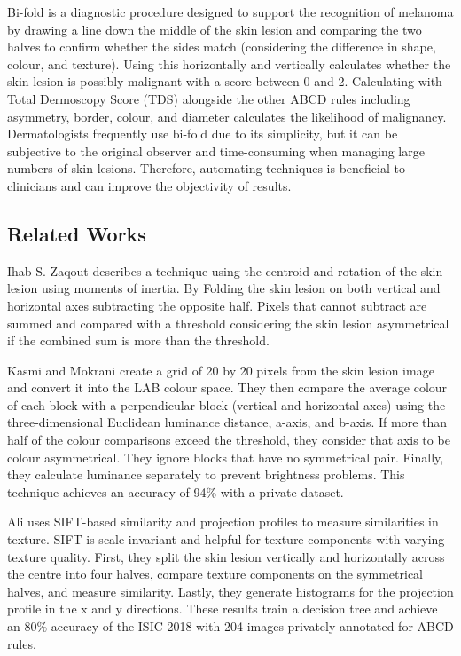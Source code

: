 Bi-fold is a diagnostic procedure designed to support the recognition of melanoma by drawing a line down the middle of the skin lesion and comparing the two halves to confirm whether the sides match (considering the difference in shape, colour, and texture). Using this horizontally and vertically calculates whether the skin lesion is possibly malignant with a score between 0 and 2. Calculating with Total Dermoscopy Score (TDS) alongside the other ABCD rules including asymmetry, border, colour, and diameter calculates the likelihood of malignancy. Dermatologists frequently use bi-fold due to its simplicity, but it can be subjective to the original observer and time-consuming when managing large numbers of skin lesions. Therefore, automating techniques is beneficial to clinicians and can improve the objectivity of results.

\subsection{Related Works}
Ihab S. Zaqout\cite{Zaqout2016} describes a technique using the centroid and rotation of the skin lesion using moments of inertia. By Folding the skin lesion on both vertical and horizontal axes subtracting the opposite half. Pixels that cannot subtract are summed and compared with a threshold considering the skin lesion asymmetrical if the combined sum is more than the threshold.

Kasmi and Mokrani\cite{Kasmi2016} create a grid of 20 by 20 pixels from the skin lesion image and convert it into the LAB colour space. They then compare the average colour of each block with a perpendicular block (vertical and horizontal axes) using the three-dimensional Euclidean luminance distance, a-axis, and b-axis. If more than half of the colour comparisons exceed the threshold, they consider that axis to be colour asymmetrical. They ignore blocks that have no symmetrical pair. Finally, they calculate luminance separately to prevent brightness problems. This technique achieves an accuracy of 94\% with a private dataset.

Ali\cite{Ali2020a} uses SIFT-based similarity and projection profiles to measure similarities in texture. SIFT is scale-invariant and helpful for texture components with varying texture quality. First, they split the skin lesion vertically and horizontally across the centre into four halves, compare texture components on the symmetrical halves, and measure similarity. Lastly, they generate histograms for the projection profile in the x and y directions. These results train a decision tree and achieve an 80\% accuracy of the ISIC 2018 with 204 images privately annotated for ABCD rules.


